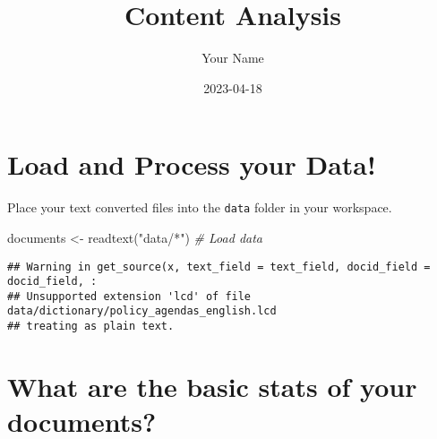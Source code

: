 \documentclass[
]{article}
\title{Content Analysis}
\author{Your Name}
\date{2023-04-18}
\newenvironment{Shaded}{\begin{snugshade}}{\end{snugshade}}
\newcommand{\AttributeTok}[1]{\textcolor[rgb]{0.77,0.63,0.00}{#1}}
\newcommand{\CommentTok}[1]{\textcolor[rgb]{0.56,0.35,0.01}{\textit{#1}}}
\newcommand{\DecValTok}[1]{\textcolor[rgb]{0.00,0.00,0.81}{#1}}
\newcommand{\FunctionTok}[1]{\textcolor[rgb]{0.00,0.00,0.00}{#1}}
\newcommand{\NormalTok}[1]{#1}
\newcommand{\OtherTok}[1]{\textcolor[rgb]{0.56,0.35,0.01}{#1}}
\newcommand{\SpecialCharTok}[1]{\textcolor[rgb]{0.00,0.00,0.00}{#1}}
\newcommand{\StringTok}[1]{\textcolor[rgb]{0.31,0.60,0.02}{#1}}
\begin{document}
\maketitle

\hypertarget{load-and-process-your-data}{%
\section{Load and Process your Data!}\label{load-and-process-your-data}}

Place your text converted files into the \texttt{data} folder in your
workspace.

\begin{Shaded}
\begin{Highlighting}[]
\NormalTok{documents }\OtherTok{\textless{}{-}} \FunctionTok{readtext}\NormalTok{(}\StringTok{"data/*"}\NormalTok{) }\CommentTok{\# Load data}
\end{Highlighting}
\end{Shaded}

\begin{verbatim}
## Warning in get_source(x, text_field = text_field, docid_field = docid_field, :
## Unsupported extension 'lcd' of file data/dictionary/policy_agendas_english.lcd
## treating as plain text.
\end{verbatim}

\begin{Shaded}
\end{Shaded}

\hypertarget{what-are-the-basic-stats-of-your-documents}{%
\section{What are the basic stats of your
documents?}\label{what-are-the-basic-stats-of-your-documents}}
\end{document}
